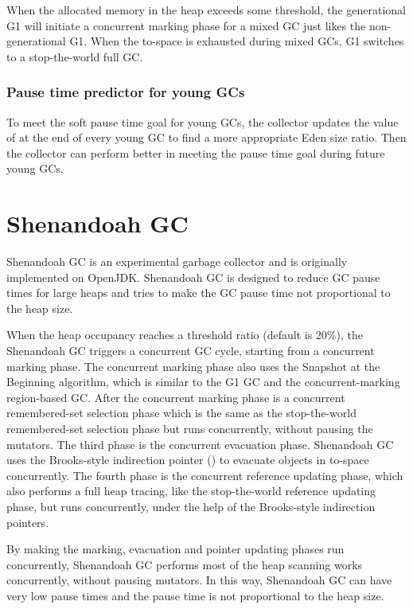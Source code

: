 When the allocated memory in the heap exceeds some threshold, the generational G1 will
initiate a concurrent marking phase for a mixed GC just likes the non-generational G1.
When the to-space is exhausted during mixed GCs, G1 switches to a stop-the-world full GC.

\subsubsection{Pause time predictor for young GCs}

To meet the soft pause time goal for young GCs, the collector updates the value of 
at the end of every young GC to find a more appropriate Eden size ratio.
Then the collector can perform better in meeting the pause time goal during future young GCs.
 
\section{Shenandoah GC}
\label{sec:shenandoahgc}

Shenandoah GC is an experimental garbage collector and is originally implemented on OpenJDK.
Shenandoah GC is designed to reduce GC pause times for large heaps and tries to make the GC pause
time not proportional to the heap size.
 
When the heap occupancy reaches a threshold ratio (default is 20\%), the Shenandoah GC triggers
a concurrent GC cycle, starting from a concurrent marking phase.
The concurrent marking phase also uses the Snapshot at the Beginning algorithm,
which is similar to the G1 GC and the concurrent-marking region-based GC.
After the concurrent marking phase is a concurrent remembered-set selection phase
which is the same as the stop-the-world remembered-set selection phase
but runs concurrently, without pausing the mutators.
The third phase is the concurrent evacuation phase. Shenandoah GC uses the Brooks-style
indirection pointer (\cite{flood2016shenandoah}) to evacuate objects in to-space
concurrently. The fourth phase is the concurrent reference updating phase, which
also performs a full heap tracing, like the stop-the-world reference updating phase,
but runs concurrently, under the help of the Brooks-style indirection pointers.

By making the marking, evacuation and pointer updating phases run concurrently, Shenandoah GC performs
most of the heap scanning works concurrently, without pausing mutators. In this way,
Shenandoah GC can have very low pause times and the pause time is not proportional
to the heap size.

